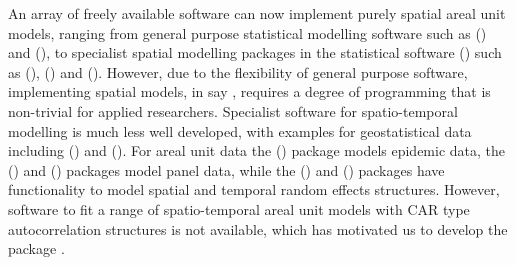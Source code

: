 \documentclass[article, nojss]{jss}
\begin{document}
An array of freely available software can now implement purely spatial areal unit models, ranging from general purpose statistical modelling software such as  (\citealp{lunn2009}) and  (\citealp{rue2009}), to specialist spatial modelling packages in the statistical software  (\citealp{R})  such as  (\citealp{lee2013}),  (\citealp{schabenberger2009}) and  (\citealp{bivand2015}). However, due to the flexibility of general purpose software, implementing spatial models, in say , requires a degree of programming that is non-trivial for applied researchers. Specialist software for spatio-temporal modelling is much less well developed, with examples for geostatistical data including  (\citealp{JSSv063i15}) and  (\citealp{JSSv063i13}). For areal unit data the  (\citealp{paul2016}) package models epidemic data, the  (\citealp{JSSv027i02}) and  (\citealp{millo2012}) packages model panel data, while the  (\citealp{pinheiro2015}) and  (\citealp{JSSv067i01}) packages have functionality to model spatial and temporal random effects structures. However, software to fit a range of spatio-temporal areal unit models with CAR type autocorrelation structures is not available, which has  motivated us to develop the  package .\\
\end{document}
